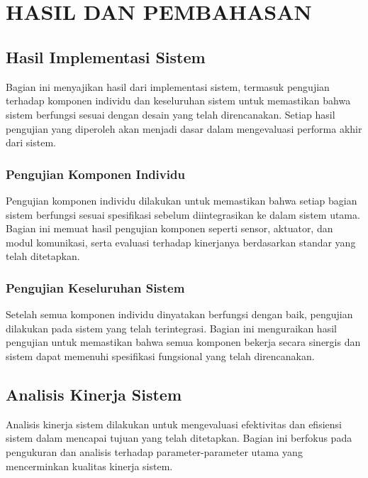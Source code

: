 
\chapter[HASIL DAN PEMBAHASAN]{\\ HASIL DAN PEMBAHASAN}

\section{Hasil Implementasi Sistem}
Bagian ini menyajikan hasil dari implementasi sistem, termasuk pengujian terhadap komponen individu dan keseluruhan sistem untuk memastikan bahwa sistem berfungsi sesuai dengan desain yang telah direncanakan. Setiap hasil pengujian yang diperoleh akan menjadi dasar dalam mengevaluasi performa akhir dari sistem.

\subsection{Pengujian Komponen Individu}
Pengujian komponen individu dilakukan untuk memastikan bahwa setiap bagian sistem berfungsi sesuai spesifikasi sebelum diintegrasikan ke dalam sistem utama. Bagian ini memuat hasil pengujian komponen seperti sensor, aktuator, dan modul komunikasi, serta evaluasi terhadap kinerjanya berdasarkan standar yang telah ditetapkan.

\subsection{Pengujian Keseluruhan Sistem}
Setelah semua komponen individu dinyatakan berfungsi dengan baik, pengujian dilakukan pada sistem yang telah terintegrasi. Bagian ini menguraikan hasil pengujian untuk memastikan bahwa semua komponen bekerja secara sinergis dan sistem dapat memenuhi spesifikasi fungsional yang telah direncanakan.

\section{Analisis Kinerja Sistem}
Analisis kinerja sistem dilakukan untuk mengevaluasi efektivitas dan efisiensi sistem dalam mencapai tujuan yang telah ditetapkan. Bagian ini berfokus pada pengukuran dan analisis terhadap parameter-parameter utama yang mencerminkan kualitas kinerja sistem.

